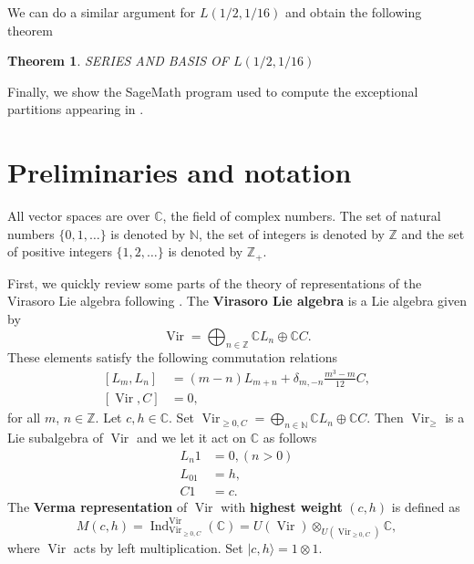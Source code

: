\documentclass[12pt, a4paper]{article}
\newtheorem{theorem}{Theorem}
\DeclareMathOperator{\Vir}{Vir}
\DeclareMathOperator{\Ind}{Ind}
\begin{document}
We can do a similar argument for $L(1/2, 1/16)$ and obtain the following theorem

\begin{theorem}
  \label{thr:5}
  SERIES AND BASIS OF $L(1/2,1/16)$
\end{theorem}

Finally, we show the SageMath program used to compute the exceptional partitions appearing in .

\section{Preliminaries and notation}
\label{sec:prel-notat}
All vector spaces are over $\mathbb{C}$, the field of complex numbers.
The set of natural numbers $\{0, 1, \dots\}$ is denoted by $\mathbb{N}$, the set of integers is denoted by $\mathbb{Z}$ and the set of positive integers $\{1, 2, \dots\}$ is denoted by $\mathbb{Z}_+$.

First, we quickly review some parts of the theory of representations of the Virasoro Lie algebra following \cite{kac_bombay_2013}.
The \textbf{Virasoro Lie algebra} is a Lie algebra given by
\begin{equation*}
  \Vir = \bigoplus_{n \in \mathbb{Z}}\mathbb{C}L_n \oplus \mathbb{C}C.
\end{equation*}
These elements satisfy the following commutation relations
\begin{align}
  \label{eq:1}
  [L_m, L_n] &= (m - n)L_{m + n} + \delta_{m, -n}\frac{m^3 -m}{12}C, \\
  \nonumber
  [\Vir, C] &= 0, 
\end{align}
for all $m$, $n \in \mathbb{Z}$.
Let $c, h \in \mathbb{C}$.
Set $\Vir_{\ge 0, C} = \bigoplus_{n \in \mathbb{N}}\mathbb{C}L_n \oplus \mathbb{C}C$.
Then $\Vir_\ge$ is a Lie subalgebra of $\Vir$ and we let it act on $\mathbb{C}$ as follows
\begin{align*}
  L_n1 &= 0, (n>0) \\
  L_01 &= h, \\
  C1 &= c.
\end{align*}
The \textbf{Verma representation} of $\Vir$ with \textbf{highest weight} $(c, h)$ is defined as 
\begin{equation*}
  M(c, h) = \Ind^{\Vir}_{\Vir_{\ge 0, C}}(\mathbb{C}) = U(\Vir) \otimes_{U(\Vir_{\ge 0, C})} \mathbb{C},
\end{equation*}
where $\Vir$ acts by left multiplication.
Set $|c, h\rangle = 1 \otimes 1$.
\end{document}
